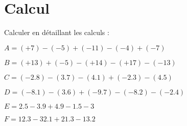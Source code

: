 \section{Calcul}

Calculer en détaillant les calculs :

\begin{questions}
	\question $A = (+7) - (-5) + (-11) - (-4) + (-7)$
	
	\question $B = (+13) + (-5) - (+14) - (+17) - (-13)$
	
	\question $C = (\num{-2.8}) - (\num{+3.7}) - (\num{+4.1}) + (\num{-2.3}) - (\num{+4.5})$
	
	\question $D = (\num{-8.1}) - (\num{+3.6}) + (\num{-9.7}) - (\num{-8.2}) - (\num{-2.4})$
	
	\question $E = \num{2.5} - \num{3.9} + \num{4.9} - \num{1.5} - 3$
	
	\question $F = \num{12.3} - \num{32.1} + \num{21.3} - \num{13.2}$
\end{questions} 